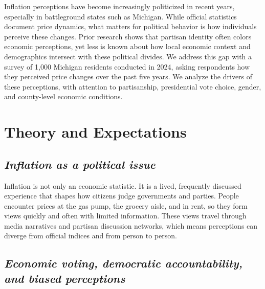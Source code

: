 \documentclass[]{interact}
\theoremstyle{plain}%
\theoremstyle{definition}
\theoremstyle{remark}
\begin{document}
Inflation perceptions have become increasingly politicized in recent years, especially in battleground states such as Michigan. While official statistics document price dynamics, what matters for political behavior is how individuals perceive these changes. Prior research shows that partisan identity often colors economic perceptions, yet less is known about how local economic context and demographics intersect with these political divides. We address this gap with a survey of 1,000 Michigan residents conducted in 2024, asking respondents how they perceived price changes over the past five years. We analyze the drivers of these perceptions, with attention to partisanship, presidential vote choice, gender, and county-level economic conditions.

\section*{Theory and Expectations}

\subsection*{\textit{Inflation as a political issue}}

Inflation is not only an economic statistic. It is a lived, frequently discussed experience that shapes how citizens judge governments and parties. People encounter prices at the gas pump, the grocery aisle, and in rent, so they form views quickly and often with limited information. These views travel through media narratives and partisan discussion networks, which means perceptions can diverge from official indices and from person to person. 

\subsection*{\textit{Economic voting, democratic accountability, and biased perceptions} }
\end{document}
